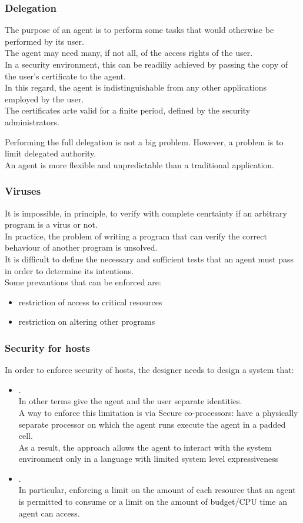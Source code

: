 \subsubsection{Delegation}
The purpose of an agent is to perform some tasks that would otherwise be performed by its user.\\
The agent may need many, if not all, of the access rights of the user.\\
In a security environment, this can be readiliy achieved by passing the copy of the user's certificate to the agent.\\
In this regard, the agent is indistinguishable from any other applications employed by the user.\\
The certificates arte valid for a finite period, defined by the security administrators.

Performing the full delegation is not a big problem. However, a problem is to limit delegated authority.\\
An agent is more flexible and unpredictable than a traditional application.
\subsubsection{Viruses}
It is impossible, in principle, to verify with complete cenrtainty if an arbitrary program is a virus or not.\\
In practice, the problem of writing a program that can verify the correct behaviour of another program is unsolved.\\
It is difficult to define the necessary and sufficient tests that an agent must pass in order to determine its intentions.\\
Some prevautions that can be enforced are: 
\begin{itemize}
\item restriction of access to critical resources
\item restriction on altering other programs
\end{itemize}
\subsubsection{Security for hosts}
In order to enforce security of hosts, the designer needs to design a system that:
\begin{itemize}
\item {}.\\
In other terms give the agent and the user separate identities.\\
A way to enforce this limitation is via Secure co-processors: have a physically separate processor on which the agent runs execute the agent in a padded cell.\\
As a result, the approach allows the agent to interact with the system environment only in a language with limited system level expressiveness
\item {}.\\
In particular, enforcing a limit on the amount of each resource that an agent is permitted to consume or a limit on the amount of budget/CPU time an agent can access.
\end{itemize}
